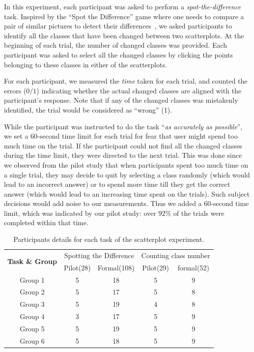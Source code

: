 {\vspace{.3em}
In this experiment, each participant was asked to perform a \emph{spot-the-difference} task. Inspired by the ``Spot the Difference'' game where one needs to compare a pair of similar pictures to detect their differences~\cite{Fukuba2009}, we asked participants to identify all the classes that have been changed between two scatterplots. At the beginning of each trial, the number of changed classes was provided. Each participant was asked to select all the changed classes by clicking the points belonging to these classes in either of the scatterplots.

For each participant, we measured the \emph{time} taken for each trial, and counted the errors ($0/1$) indicating whether the actual changed classes are aligned with the participant's response. Note that if any of the changed classes was mistakenly identified, the trial would be considered as ``wrong'' (1).

While the participant was instructed to do the task ``\emph{as accurately as possible}'', we set a $60$-second time limit for each trial for fear that user might spend too much time on the trial. If the participant could not find all the changed classes during the time limit, they were directed to the next trial. %
This was done since we observed from the pilot study that when participants spent too much time on a single trial, they may decide to quit by selecting a class randomly (which would lead to an incorrect answer) or to spend more time till they get the correct answer
(which would lead to an increasing time spent on the trials). Such subject decisions would add noise to our measurements. Thus we added a $60$-second time limit, which was indicated by our pilot study: over $92\%$ of the trials were completed within that time.

\begin{table}[ht]
\renewcommand\arraystretch{1}
\centering
\caption{Participants details for each task of the scatterplot experiment.}
\label{tab:participantDetail}
\begin{tabular}{|c|c|c|c|c|}
\hline
\multirow{2}{*}{\textbf{Task \& Group}} & \multicolumn{2}{c|}{Spotting the Difference} & \multicolumn{2}{c|}{Counting class number} \\
\cline{2-5}
& Pilot(28) & Formal(108) & Pilot(29) & formal(52) \\
\hline
Group 1 & 5 & 18 & 5  & 9 \\
\hline
Group 2 & 5 & 17 & 5  & 8 \\
\hline
Group 3 & 5 & 19 & 4  & 8 \\
\hline
Group 4 & 3 & 17 & 5  & 9 \\
\hline
Group 5 & 5 & 19 & 5  & 9 \\
\hline
Group 6 & 5 & 18 & 5  & 9 \\
\hline
\end{tabular}
\end{table}


}
